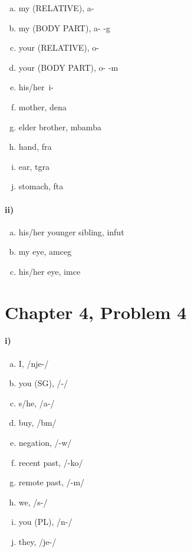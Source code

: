 \documentclass[12pt]{article}
\begin{document}
\begin{multicols}{2}
    \begin{enumerate}[a)]
        \item my (RELATIVE), a-
        \item my (BODY PART), a- -g
        \item your (RELATIVE), o-
        \item your (BODY PART), o- -m
        \item his/her\, i-
        \item mother, dena
        \item elder brother, mbamba
        \item hand, fra
        \item ear, tgra
        \item stomach, fta
    \end{enumerate}
\end{multicols}

\paragraph{ii)}

\begin{multicols}{2}
    \begin{enumerate}[a)]
        \item his/her younger sibling, infut
        \item my eye, amceg
        \item his/her eye, imce
    \end{enumerate}
\end{multicols}

\section*{Chapter 4, Problem 4}

\paragraph{i)}

\begin{multicols}{2}
    \begin{enumerate}[a)]
        \item I, /nje-/
        \item you (SG), /\textopeno-/
        \item s/he, /a-/
        \item buy, /b\textopeno m/
        \item negation, /-w\textepsilon\textepsilon/
        \item recent past, /-ko/
        \item remote past, /-m\textepsilon/
        \item we, /s\textepsilon-/
        \item you (PL),  /n\textepsilon-/
        \item they, /je-/
    \end{enumerate}
\end{multicols}
\end{document}
